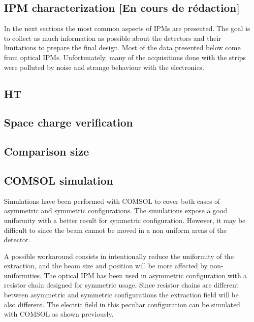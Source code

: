 \begin{refsection}

  \section{IPM characterization [En cours de rédaction]}
  In the next sections the most common aspects of IPMs are presented. The goal is to collect as much information as possible about the detectors and their limitations to prepare the final design. Most of the data presented below come from optical IPMs. Unfortunately, many of the acquisitions done with the strips were polluted by noise and strange behaviour with the electronics.

  \subsection{HT}
  

  

  \subsection{Space charge verification}

  \subsection{Comparison size}

  \subsection{COMSOL simulation}
  Simulations have been performed with COMSOL to cover both cases of asymmetric and symmetric configurations. The simulations expose a good uniformity with a  better result for symmetric configuration. However, it may be difficult to since the beam cannot be moved in a non uniform areas of the detector.

  A possible workaround consists in intentionally reduce the uniformity of the extraction, and the beam size and position will be more affected by non-uniformities. The optical IPM has been used in asymmetric configuration with a resistor chain designed for symmetric usage. Since resistor chains are different between asymmetric and symmetric configurations the extraction field will be also different. The electric field in this peculiar configuration can be simulated with COMSOL as shown previously.


\end{refsection}
